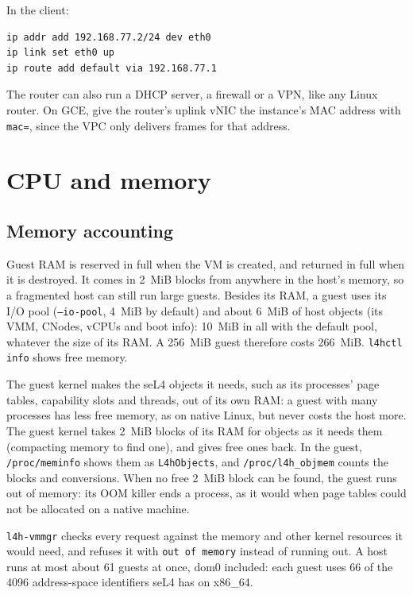 \documentclass[11pt,a4paper]{report}
\newcommand{\cmd}[1]{\texttt{#1}}
\newcommand{\file}[1]{\texttt{#1}}
\begin{document}
In the client:
\begin{lstlisting}
ip addr add 192.168.77.2/24 dev eth0
ip link set eth0 up
ip route add default via 192.168.77.1
\end{lstlisting}
The router can also run a DHCP server, a firewall or a VPN, like any Linux
router. On GCE, give the router's uplink vNIC the instance's MAC address with
\texttt{mac=}, since the VPC only delivers frames for that address.

\chapter{CPU and memory}
\label{ch:cpu}

\section{Memory accounting}
\label{sec:memory}

Guest RAM is reserved in full when the VM is created, and returned in full
when it is destroyed. It comes in 2~MiB blocks from anywhere in the host's
memory, so a fragmented host can still run large guests. Besides its RAM,
a guest uses its I/O pool (\texttt{--io-pool}, 4~MiB by default) and about
6~MiB of host objects (its VMM, CNodes, vCPUs and boot info): 10~MiB in
all with the default pool, whatever the size of its RAM. A 256~MiB guest
therefore costs 266~MiB. \cmd{l4hctl info} shows free memory.

The guest kernel makes the seL4 objects it needs, such as its processes'
page tables, capability slots and threads, out of its own RAM: a guest
with many processes has less free memory, as on native Linux, but never
costs the host more. The guest kernel takes 2~MiB blocks of its RAM for
objects as it needs them (compacting memory to find one), and gives free
ones back. In the guest, \file{/proc/meminfo} shows them as
\texttt{L4hObjects}, and \file{/proc/l4h\_objmem} counts the blocks and
conversions. When no free 2~MiB block can be found, the guest runs out of
memory: its OOM killer ends a process, as it would when page tables could
not be allocated on a native machine.



\texttt{l4h-vmmgr} checks every request against the memory and other kernel
resources it would need, and refuses it with \texttt{out of memory} instead
of running out. A host runs at most about 61 guests at once, dom0 included:
each guest uses 66 of the 4096 address-space identifiers seL4 has on
x86\_64.
\end{document}
